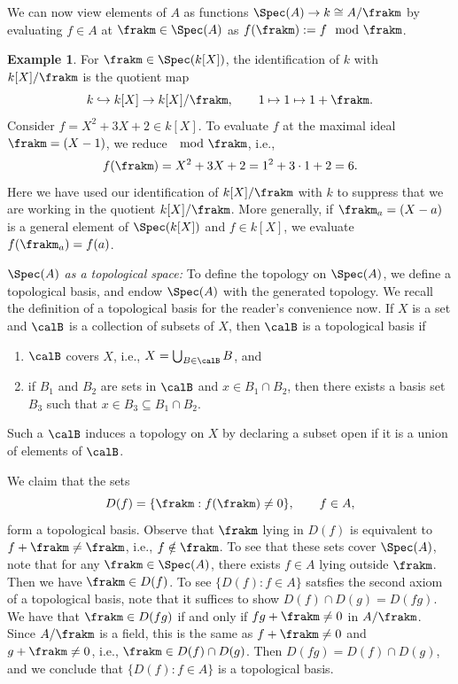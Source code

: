 \documentclass[12pt]{amsart}
\theoremstyle{plain}
\theoremstyle{definition}
\newtheorem{example}[theorem]{Example}
\begin{document}
We can now view elements of $A$ as functions $\Spec(A) \to k \cong A/\frakm$ by evaluating $f\in A$ at $\frakm\in\Spec(A)$ as $f(\frakm):=f \mod \frakm$.

\begin{example}
For $\frakm \in \Spec(k[X])$, the identification of $k$ with $k[X]/\frakm$ is the quotient map
$$k \hookrightarrow k[X] \to k[X]/\frakm, \qquad 1 \mapsto 1 \mapsto 1+\frakm.$$
Consider $f = X^2 +3X +2 \in k[X]$.
To evaluate $f$ at the maximal ideal $\frakm = (X-1)$, we reduce $\mod \frakm$, i.e.,
$$f(\frakm) = X^2 + 3X +2 = 1^2 + 3\cdot 1 +2 = 6.$$
Here we have used our identification of $k[X]/\frakm$ with $k$ to suppress that we are working in the quotient $k[X]/\frakm$.
More generally, if $\frakm_a = (X-a)$ is a general element of $\Spec(k[X])$ and $f \in k[X]$, we evaluate $f(\frakm_a) = f(a)$.
\end{example}

\emph{$\Spec(A)$ as a topological space:}
To define the topology on $\Spec(A)$, we define a topological basis, and endow $\Spec(A)$ with the generated topology.
We recall the definition of a topological basis for the reader's convenience now.
If $X$ is a set and $\calB$ is a collection of subsets of $X$, then $\calB$ is a topological basis if
\begin{enumerate}
\item $\calB$ covers $X$, i.e., $X = \bigcup_{B \in \calB} B$, and
\item if $B_1$ and $B_2$ are sets in $\calB$ and $x \in B_1 \cap B_2$, then there exists a basis set $B_3$ such that $x \in B_3 \subseteq B_1 \cap B_2$.
\end{enumerate}
Such a $\calB$ induces a topology on $X$ by declaring a subset open if it is a union of elements of $\calB$.

We claim that the sets 
$$D(f) = \{\frakm : f(\frakm) \ne 0\}, \qquad f \in A,$$
form a topological basis.
Observe that $\frakm$ lying in $D(f)$ is equivalent to $f + \frakm \ne \frakm$, i.e., $f \notin \frakm$.
To see that these sets cover $\Spec(A)$, note that for any $\frakm \in \Spec(A)$, there exists $f \in A$ lying outside $\frakm$.
Then we have $\frakm \in D(f)$.
To see $\{D(f) : f \in A\}$ satsfies the second axiom of a topological basis, note that it suffices to show $D(f) \cap D(g) = D(fg)$.
We have that $\frakm \in D(fg)$ if and only if $fg +\frakm \ne 0$ in $A/\frakm$.
Since $A/\frakm$ is a field, this is the same as $f+\frakm \ne 0$ and $g+\frakm \ne 0$, i.e., $\frakm \in D(f) \cap D(g)$.
Then $D(fg)=D(f)\cap D(g)$, and we conclude that $\{D(f) : f \in A\}$ is a topological basis.
\end{document}
